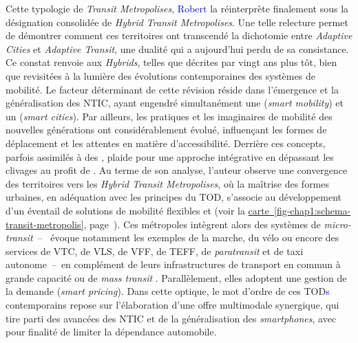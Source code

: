 \begin{refsegment}
Cette typologie de \textsl{Transit Metropolises}, \textcolor{blue}{Robert} \textcolor{blue}{\textcite[131]{cervero_transit_2020}} la réinterprète finalement sous la désignation consolidée de \textsl{Hybrid Transit Metropolises}. Une telle relecture permet de démontrer comment ces territoires ont transcendé la dichotomie entre \textsl{Adaptive Cities} et \textsl{Adaptive Transit}, une dualité qui a aujourd’hui perdu de sa consistance. Ce constat renvoie aux \textsl{Hybrids}, telles que décrites par \textcolor{blue}{\textcite[213-295]{cervero_transit_1998}} vingt ans plus tôt, bien que revisitées à la lumière des évolutions contemporaines des systèmes de mobilité. Le facteur déterminant de cette révision réside dans l’émergence et la généralisation des \acrshort{NTIC}, ayant engendré simultanément une  (\textsl{smart mobility}) et un  (\textsl{smart cities}). Par ailleurs, les pratiques et les imaginaires de mobilité des nouvelles générations ont considérablement évolué, influençant les formes de déplacement et les attentes en matière d’accessibilité. Derrière ces concepts, parfois assimilés à des , \textcolor{blue}{\textcite[137-143]{cervero_transit_2020}} plaide pour une approche intégrative en dépassant les clivages au profit de . Au terme de son analyse, l'auteur observe une convergence des territoires vers les \textsl{Hybrid Transit Metropolises}, où la maîtrise des formes urbaines, en adéquation avec les principes du \acrshort{TOD}, s'associe au développement d'un éventail de solutions de mobilité flexibles et  (voir la \hyperref[fig-chap1:schema-transit-metropolis]{carte~\ref{fig-chap1:schema-transit-metropolis}}, page~\pageref{fig-chap1:schema-transit-metropolis}). Ces métropoles intègrent alors des systèmes de \textsl{micro-transit}~–~\textcolor{blue}{\textcite[144]{cervero_transit_2020}} évoque notamment les exemples de la marche, du vélo ou encore des services de \acrfull{VTC}, de \acrfull{VLS}, de \acrfull{VFF}, de \acrfull{TEFF}, de \textsl{paratransit} et de taxi autonome~–~en complément de leurs infrastructures de transport en commun à grande capacité ou de \textsl{mass transit} \textcolor{blue}{\autocite[7]{thomas_transit-oriented_2020}}. Parallèlement, elles adoptent une gestion  de la demande (\textsl{smart pricing}). Dans cette optique, le mot d’ordre de ces \acrshort{TOD}\textcolor{blue}{s} contemporains repose sur l’élaboration d’une offre multimodale synergique, qui tire parti des avancées des \acrshort{NTIC} et de la généralisation des \textsl{smartphones}, avec pour finalité de limiter la dépendance automobile.%


\end{refsegment}
